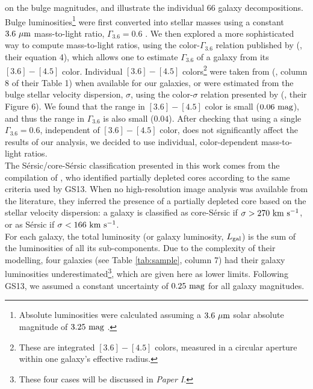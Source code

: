 \documentclass[preprint2]{emulateapj}
\begin{document}
on the bulge magnitudes, and illustrate the individual 66 galaxy decompositions. \\
Bulge luminosities\footnote{Absolute luminosities were calculated 
assuming a $3.6\rm~\mu m$ solar absolute magnitude of $3.25\rm~mag$ \citep{sani2011}.} 
were first converted into stellar masses using a constant $3.6\rm~\mu m$ mass-to-light ratio, $\Gamma_{3.6} = 0.6$ \citep{meidt2014}.
We then explored a more sophisticated way to compute mass-to-light ratios, 
using the color-$\Gamma_{3.6}$ relation published by 
\citeauthor{meidt2014} (\citeyear{meidt2014}, their equation 4), 
which allows one to estimate $\Gamma_{3.6}$ of a galaxy from its $[3.6] - [4.5]$ color. 
Individual $[3.6] - [4.5]$ colors\footnote{These are integrated $[3.6] - [4.5]$ colors, measured in a circular aperture 
within one galaxy's effective radius.} were taken from 
\citeauthor{peletier2012} (\citeyear{peletier2012}, column 8 of their Table 1) 
when available for our galaxies, 
or were estimated from the bulge stellar velocity dispersion, $\sigma$, 
using the color-$\sigma$ relation presented by \citeauthor{peletier2012} (\citeyear{peletier2012}, their Figure 6).
We found that the range in $[3.6] - [4.5]$ color is small ($0.06\rm~mag$), 
and thus the range in $\Gamma_{3.6}$ is also small ($0.04$).
After checking that using a single $\Gamma_{3.6} = 0.6$, independent of $[3.6] - [4.5]$ color, 
does not significantly affect the results of our analysis, 
we decided to use individual, color-dependent mass-to-light ratios. \\
The S\'ersic/core-S\'ersic classification presented in this work 
comes from the compilation of \citet{savorgnangraham2014},
who identified partially depleted cores according to the same criteria used by GS13.
When no high-resolution image analysis was available from the literature, 
they inferred the presence of a partially depleted core based on the stellar velocity dispersion:
a galaxy is classified as core-S\'ersic if $\sigma > 270\rm~km~s^{-1}$,
or as S\'ersic if $\sigma < 166\rm~km~s^{-1}$. \\
For each galaxy, the total luminosity (or galaxy luminosity, $L_{\rm gal}$) is the sum of the luminosities of all its sub-components. 
Due to the complexity of their modelling, 
four galaxies (see Table \ref{tab:sample}, column 7) had their galaxy luminosities 
underestimated\footnote{These four cases will be discussed in \emph{Paper I}.}, 
which are given here as lower limits. 
Following GS13, we assumed a constant uncertainty of $0.25\rm~mag$ for all galaxy magnitudes.
\end{document}
